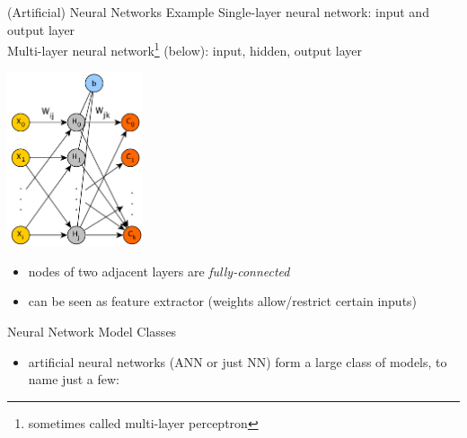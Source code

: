 \documentclass{beamer}
\begin{document}
\begin{frame}{(Artificial) Neural Networks Example}
Single-layer neural network: input and output layer\\
Multi-layer neural network\footnote{sometimes called multi-layer perceptron}  (below): input, hidden, output layer
\begin{center}
\includegraphics[width=0.3\textwidth]{basic_ff_nn}
\end{center}
\begin{itemize}
\item nodes of two adjacent layers are \emph{fully-connected}
\item can be seen as feature extractor (weights allow/restrict certain inputs)
\end{itemize}
\end{frame}

\begin{frame}{Neural Network Model Classes}
\begin{itemize}
\item artificial neural networks (ANN or just NN) form a large class of models, to name just a few:
\end{itemize}  
\end{frame}
\end{document}
